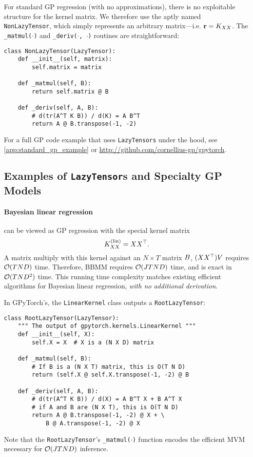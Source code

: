 For standard GP regression (with no approximations), there is no exploitable structure for the kernel matrix.
We therefore use the aptly named {\tt NonLazyTensor}, which simply represents an arbitrary matrix---i.e. $\mathbf{r} = K_{XX}$.
The {\tt \_matmul($\cdot$)} and {\tt \_deriv($\cdot$, $\cdot$)} routines are straightforward:
%
\begin{verbatim}
class NonLazyTensor(LazyTensor):
    def __init__(self, matrix):
        self.matrix = matrix

    def _matmul(self, B):
        return self.matrix @ B

    def _deriv(self, A, B):
        # d(tr(A^T K B)) / d(K) = A B^T
        return A @ B.transpose(-1, -2)
\end{verbatim}
%
\noindent
For a full GP code example that uses {\tt LazyTensors} under the hood, see \cref{app:standard_gp_example} or \url{http://github.com/cornellius-gp/gpytorch}.


\subsection{Examples of {\tt LazyTensor}s and Specialty GP Models}
\paragraph{Bayesian linear regression} can be viewed as GP regression with the special kernel matrix
\[
  K_{XX}^{(\text{lin})} = XX^{\top}.
\]
A matrix multiply with this kernel against an $N \times T$ matrix $B$, $(XX^{\top})V$ requires $\bigo{TND}$ time.
Therefore, BBMM requires $\bigo{JTND}$ time, and is exact in $\bigo{TND^2}$ time.
This running time complexity matches existing efficient algorithms for Bayesian linear regression, \emph{with no additional derivation}.

In GPyTorch's, the {\tt LinearKernel} class outputs a {\tt RootLazyTensor}:
%
\begin{verbatim}
class RootLazyTensor(LazyTensor):
    """ The output of gpytorch.kernels.LinearKernel """
    def __init__(self, X):
        self.X = X  # X is a (N X D) matrix

    def _matmul(self, B):
        # If B is a (N X T) matrix, this is O(T N D)
        return (self.X @ self.X.transpose(-1, -2) @ B

    def _deriv(self, A, B):
        # d(tr(A^T K B)) / d(X) = A B^T X + B A^T X
        # if A and B are (N X T), this is O(T N D)
        return A @ B.transpose(-1, -2) @ X + \
            B @ A.transpose(-1, -2) @ X
\end{verbatim}
%
\noindent
Note that the {\tt RootLazyTensor}'s {\tt \_matmul($\cdot$)} function encodes the efficient MVM necessary for $\bigo{JTND}$ inference.

